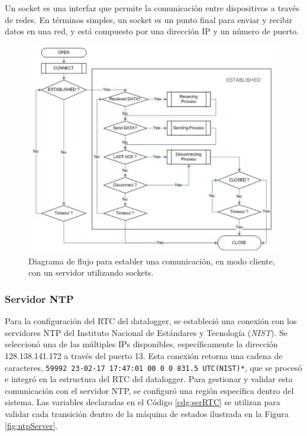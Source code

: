 Un socket es una interfaz que permite la comunicación entre dispositivos a través de redes. En términos simples, un socket es un punto final para enviar y recibir datos en una red, y está compuesto por una dirección IP y un número de puerto.
\begin{figure}[H]
    \centering
    \includegraphics[width=0.9\linewidth]{Figuras/datalogger/Firmware/socketDiagramClientW5100.png}
    \caption{Diagrama de flujo para establer una comunicación, en modo cliente, con un servidor utilizando sockets.}
    \label{fig:socketDiagramClientW5100}
\end{figure}

\subsubsection{Servidor NTP}\label{sec:serverNTP}
Para la configuración del RTC del datalogger, se estableció una conexión con los servidores NTP del Instituto Nacional de Estándares y Tecnología (\textit{NIST}). Se seleccionó una de las múltiples IPs disponibles, específicamente la dirección 128.138.141.172 a través del puerto 13. Esta conexión retorna una cadena de caracteres, \texttt{59992 23-02-17 17:47:01 00 0 0 831.5 UTC(NIST)*}, que se procesó e integró en la estructura del RTC del datalogger. Para gestionar y validar esta comunicación con el servidor NTP, se configuró una región específica dentro del sistema. Las variables declaradas en el Código \ref{cdg:serRTC} se utilizan para validar cada transición dentro de la máquina de estados ilustrada en la Figura \ref{fig:ntpServer}.


